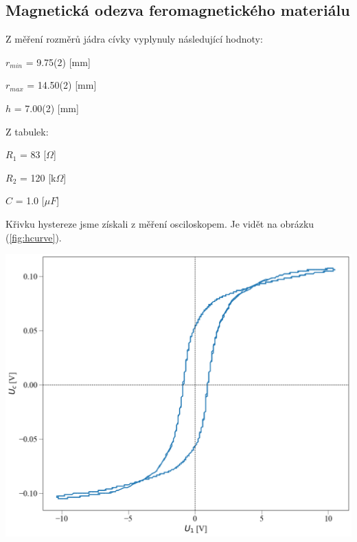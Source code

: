\documentclass[a4paper,11pt]{article}
\begin{document}
    \begin{minipage}[t]{0.5\textwidth} 
        \subsection{Magnetická odezva feromagnetického materiálu}
            Z měření rozměrů jádra cívky vyplynuly následující hodnoty: 
            \begin{center}
                $r_{min}$ = 9.75(2) [mm]
                \vspace{5pt}
                \par $r_{max}$ = 14.50(2) [mm]
                \vspace{5pt}
                \par $h$ = 7.00(2) [mm]
            \end{center}
            Z tabulek: 
            \begin{center}
                $R_1$ = 83 [$\Omega$]
                \vspace{5pt}
                \par $R_2$ = 120 [k$\Omega$]
                \vspace{5pt}
                \par $C$ = 1.0 [$\mu F$]
            \end{center}
            \vspace{10pt}
            Křivku hystereze jsme získali z měření osciloskopem. Je vidět na obrázku (\ref{fig:hcurve}).
            \vspace{10pt}
            \par 
            \centering
            \includegraphics[scale=0.26]{hist_curve}

\end{minipage}
\end{document}
